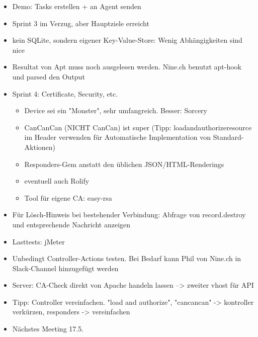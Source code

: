 \documentclass[class=scrbook,crop=false]{standalone}
\begin{document}
	\begin{itemize}
        \item Demo: Tasks erstellen + an Agent senden
        \item Sprint 3 im Verzug, aber Hauptziele erreicht
        \item kein SQLite, sondern eigener Key-Value-Store: Wenig Abhängigkeiten sind nice
        \item Resultat von Apt muss noch ausgelesen werden. Nine.ch benutzt apt-hook und parsed den Output
        \item Sprint 4: Certificate, Security, etc.
        \begin{itemize}
            \item Device sei ein "Monster", sehr umfangreich. Besser: Sorcery
            \item CanCanCan (NICHT CanCan) ist super (Tipp: load\textunderscore and\textunderscore authorize\textunderscore resource im Header verwenden für Automatische Implementation von Standard-Aktionen)
            \item Responders-Gem anstatt den üblichen JSON/HTML-Renderings
            \item eventuell auch Rolify
            \item Tool für eigene CA: easy-rsa
        \end{itemize}
        \item Für Lösch-Hinweis bei bestehender Verbindung: Abfrage von record.destroy und entsprechende Nachricht anzeigen
        \item Lasttests: jMeter
        \item Unbedingt Controller-Actions testen. Bei Bedarf kann Phil von Nine.ch in Slack-Channel hinzugefügt werden
        \item Server: CA-Check direkt von Apache handeln lassen --> zweiter vhost für API
        \item Tipp: Controller vereinfachen. "load and authorize", "cancancan" -> kontroller verkürzen, responders -> vereinfachen
        \item Nächstes Meeting 17.5.
    \end{itemize}
    
\end{document}

